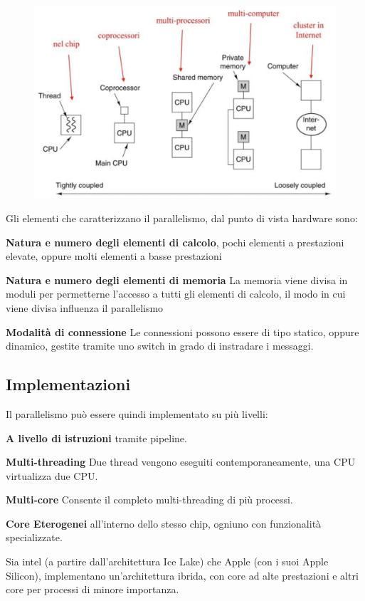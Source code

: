 \begin{figure}[H]
    \centering
    \includegraphics[width=0.45\linewidth]{assets/parallellismo.jpg}
\end{figure}

Gli elementi che caratterizzano il parallelismo, dal punto di vista hardware sono:
\begin{sitemize}
    \item \textbf{Natura e numero degli elementi di calcolo}, pochi elementi a prestazioni elevate, oppure molti elementi a basse prestazioni
    \item \textbf{Natura e numero degli elementi di memoria} La memoria viene divisa in moduli per permetterne l'accesso a tutti gli elementi di calcolo, il modo in cui viene divisa influenza il parallelismo
    \item \textbf{Modalità di connessione} Le connessioni possono essere di tipo statico, oppure dinamico, gestite tramite uno switch in grado di instradare i messaggi.
\end{sitemize}

\subsection{Implementazioni}
Il parallelismo può essere quindi implementato su più livelli:
\begin{sitemize}
    \item \textbf{A livello di istruzioni} tramite pipeline.
    \item \textbf{Multi-threading} Due thread vengono eseguiti contemporaneamente, una CPU virtualizza due CPU.
    \item \textbf{Multi-core} Consente il completo multi-threading di più processi.
    \item \textbf{Core Eterogenei} all'interno dello stesso chip, ogniuno con funzionalità specializzate.
\end{sitemize}

\begin{note}
    Sia intel (a partire dall'architettura Ice Lake) che Apple (con i suoi Apple Silicon), implementano un'architettura ibrida, con core ad alte prestazioni e altri core per processi di minore importanza.
\end{note}